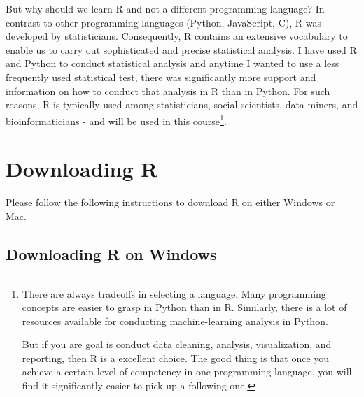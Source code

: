 \documentclass[
]{book}
\begin{document}
But why should we learn R and not a different programming language? In contrast to other programming languages (Python, JavaScript, C), R was developed by statisticians. Consequently, R contains an extensive vocabulary to enable us to carry out sophisticated and precise statistical analysis. I have used R and Python to conduct statistical analysis and anytime I wanted to use a less frequently used statistical test, there was significantly more support and information on how to conduct that analysis in R than in Python. For such reasons, R is typically used among statisticians, social scientists, data miners, and bioinformaticians - and will be used in this course\footnote{There are always tradeoffs in selecting a language. Many programming concepts are easier to grasp in Python than in R. Similarly, there is a lot of resources available for conducting machine-learning analysis in Python.

  But if you are goal is conduct data cleaning, analysis, visualization, and reporting, then R is a excellent choice. The good thing is that once you achieve a certain level of competency in one programming language, you will find it significantly easier to pick up a following one.}.

\hypertarget{downloading-r}{%
\section{Downloading R}\label{downloading-r}}

Please follow the following instructions to download R on either Windows or Mac.

\hypertarget{downloading-r-on-windows}{%
\subsection{Downloading R on Windows}\label{downloading-r-on-windows}}
\end{document}
